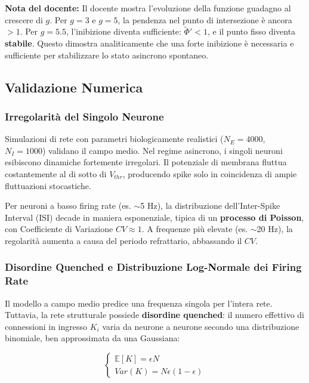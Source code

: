 \begin{tcolorbox}[colback=gray!5, colframe=gray!40, arc=2mm, boxrule=0.5pt]
\textbf{Nota del docente:} Il docente mostra l'evoluzione della funzione guadagno al crescere di $g$. Per $g=3$ e $g=5$, la pendenza nel punto di intersezione è ancora $> 1$. Per $g=5.5$, l'inibizione diventa sufficiente: $\tilde{\Phi}' < 1$, e il punto fisso diventa \textbf{stabile}. Questo dimostra analiticamente che una forte inibizione è necessaria e sufficiente per stabilizzare lo stato asincrono spontaneo.
\end{tcolorbox}


\subsection{Validazione Numerica}

\subsubsection{Irregolarità del Singolo Neurone}

Simulazioni di rete con parametri biologicamente realistici ($N_E = 4000$, $N_I = 1000$) validano il campo medio. Nel regime asincrono, i singoli neuroni esibiscono dinamiche fortemente irregolari. Il potenziale di membrana fluttua costantemente al di sotto di $V_{thr}$, producendo spike solo in coincidenza di ampie fluttuazioni stocastiche. 

Per neuroni a basso firing rate (es. $\sim$5 Hz), la distribuzione dell'Inter-Spike Interval (ISI) decade in maniera esponenziale, tipica di un \textbf{processo di Poisson}, con Coefficiente di Variazione $CV \approx 1$. A frequenze più elevate (es. $\sim$20 Hz), la regolarità aumenta a causa del periodo refrattario, abbassando il $CV$.

\subsubsection{Disordine Quenched e Distribuzione Log-Normale dei Firing Rate}

Il modello a campo medio predice una frequenza singola per l'intera rete. Tuttavia, la rete strutturale possiede \textbf{disordine quenched}: il numero effettivo di connessioni in ingresso $K_i$ varia da neurone a neurone secondo una distribuzione binomiale, ben approssimata da una Gaussiana:

\begin{equation}
\begin{cases}
\mathbb{E}[K] = \epsilon N \\
Var(K) = N\epsilon(1-\epsilon)
\end{cases}
\end{equation}

